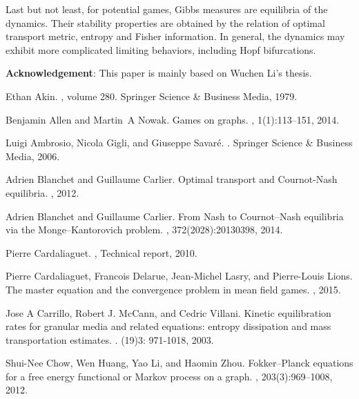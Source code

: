 \documentclass[11pt,reqno]{amsart}
\begin{document}
Last but not least, for potential games, Gibbs measures are equilibria of the dynamics. Their stability properties are obtained by the relation of optimal transport metric, entropy and Fisher information. In general, the dynamics may exhibit more complicated limiting behaviors, including Hopf bifurcations.

\textbf{Acknowledgement}: This paper is mainly based on Wuchen Li's thesis. 
\begin{thebibliography}{10}

Ethan Akin.
, volume 280.
\newblock Springer Science \& Business Media, 1979.

Benjamin Allen and Martin~A Nowak.
\newblock Games on graphs.
, 1(1):113--151, 2014.


Luigi Ambrosio, Nicola Gigli, and Giuseppe Savar{\'e}.
.
\newblock Springer Science \& Business Media, 2006.

Adrien Blanchet and Guillaume Carlier.
\newblock Optimal transport and Cournot-Nash equilibria.
, 2012.

Adrien Blanchet and Guillaume Carlier.
\newblock From Nash to Cournot--Nash equilibria via the Monge--Kantorovich
  problem.
, 372(2028):20130398, 2014.


Pierre Cardaliaguet. 
, Technical report, 2010.

Pierre Cardaliaguet, Francois Delarue, Jean-Michel Lasry, and Pierre-Louis Lions.
\newblock The master equation and the convergence problem in mean field games.
, 2015.

Jose A Carrillo, Robert J. McCann, and Cedric Villani. 
\newblock Kinetic equilibration rates for granular media and related equations: entropy dissipation and mass transportation estimates.
. (19)3: 971-1018, 2003.


Shui-Nee Chow, Wen Huang, Yao Li, and Haomin Zhou.
\newblock Fokker--Planck equations for a free energy functional or Markov process on a graph.
, 203(3):969--1008,
  2012.


\end{thebibliography}
\end{document}
